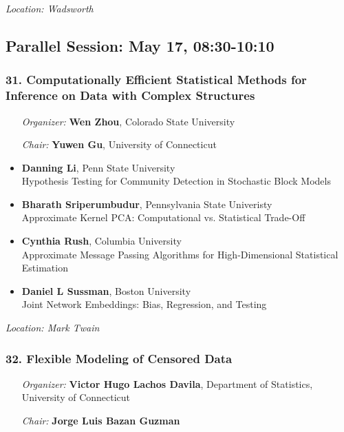 \emph{Location: Wadsworth}

\subsection*{Parallel Session: May 17, 08:30-10:10}

\subsubsection*{31. Computationally Efficient Statistical Methods for Inference on Data with Complex Structures}

\begin{enumerate}[align=left]
\item [\emph{Organizer:}] \textbf{Wen Zhou}, Colorado State University
\item [\emph{Chair:}] \textbf{Yuwen Gu},  University of Connecticut
\end{enumerate}

\begin{itemize}
\item \textbf{Danning Li}, Penn State University \\
Hypothesis Testing for Community Detection in Stochastic Block Models
\item \textbf{Bharath Sriperumbudur}, Pennsylvania State Univeristy \\
Approximate Kernel PCA: Computational vs. Statistical Trade-Off
\item \textbf{Cynthia Rush}, Columbia University \\
Approximate Message Passing Algorithms for High-Dimensional Statistical Estimation
\item \textbf{Daniel L Sussman}, Boston University \\
Joint Network Embeddings: Bias, Regression, and Testing
\end{itemize}

\emph{Location: Mark Twain}

\subsubsection*{32. Flexible Modeling of Censored Data}

\begin{enumerate}[align=left]
\item [\emph{Organizer:}] \textbf{Victor Hugo Lachos Davila}, Department of Statistics, University of Connecticut
\item [\emph{Chair:}] \textbf{Jorge Luis Bazan Guzman}
\end{enumerate}

